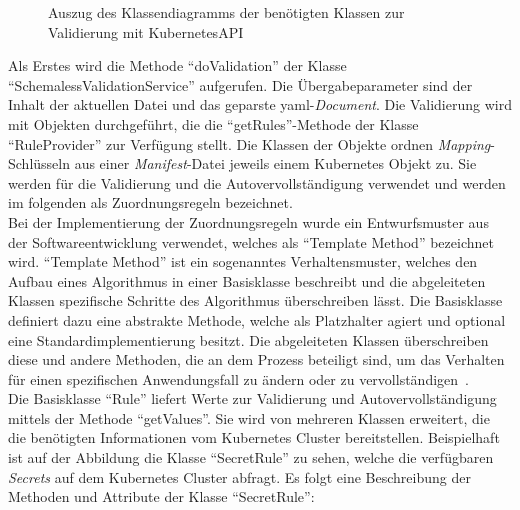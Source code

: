 \begin{figure}[htp] %
  \centering
  \caption{Auszug des Klassendiagramms der benötigten Klassen zur Validierung mit KubernetesAPI}
  \label{fig:class-diagram-yaml-language-service-validation-kubernetes}
\end{figure}

Als Erstes wird die Methode ``doValidation'' der Klasse ``SchemalessValidationService'' aufgerufen.
Die Übergabeparameter sind der Inhalt der aktuellen Datei und das geparste \ac{yaml}-\textit{Document}.
Die Validierung wird mit Objekten durchgeführt, die die ``getRules''-Methode der Klasse ``RuleProvider'' zur Verfügung stellt.
Die Klassen der Objekte ordnen \textit{Mapping}-Schlüsseln aus einer \textit{Manifest}-Datei jeweils
einem Kubernetes Objekt zu.
Sie werden für die Validierung und die Autovervollständigung verwendet und werden im folgenden als Zuordnungsregeln bezeichnet.
\\
Bei der Implementierung der Zuordnungsregeln wurde ein Entwurfsmuster aus der Softwareentwicklung verwendet, welches als ``Template Method'' bezeichnet wird.
``Template Method'' ist ein sogenanntes Verhaltensmuster, welches den Aufbau eines Algorithmus in einer Basisklasse beschreibt und
die abgeleiteten Klassen spezifische Schritte des Algorithmus überschreiben lässt.
Die Basisklasse definiert dazu eine abstrakte Methode, welche als Platzhalter agiert und optional eine Standardimplementierung besitzt.
Die abgeleiteten Klassen überschreiben diese und andere Methoden, die an dem Prozess beteiligt sind, um
das Verhalten für einen spezifischen Anwendungsfall zu ändern oder zu vervollständigen~\cite{typescript-design-pattern-chapter-6,design-patterns-refactoring-guru}.
\\
Die Basisklasse ``Rule'' liefert Werte zur Validierung und Autovervollständigung mittels der Methode ``getValues''.
Sie wird von mehreren Klassen erweitert, die die benötigten Informationen vom Kubernetes Cluster bereitstellen.
Beispielhaft ist auf der Abbildung die Klasse ``SecretRule'' zu sehen, welche die verfügbaren \textit{Secrets} auf dem Kubernetes Cluster abfragt.
Es folgt eine Beschreibung der Methoden und Attribute der Klasse ``SecretRule'':

